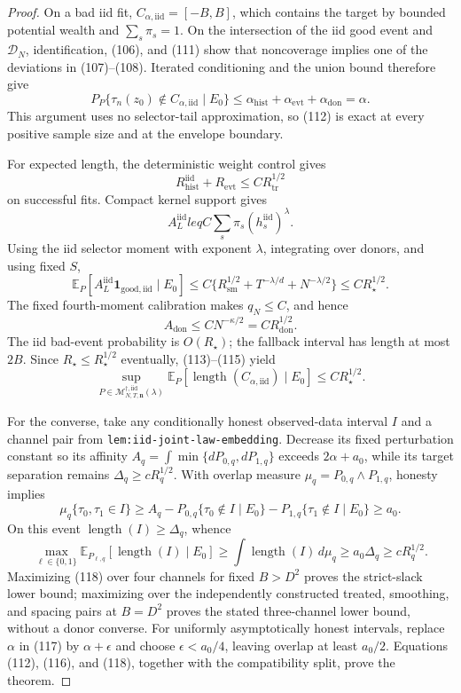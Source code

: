 \documentclass{article}
\begin{document}
\begin{proof}
On a bad iid fit, \(C_{\alpha,\mathrm{iid}}=[-B,B]\), which contains the target by bounded potential wealth and \(\sum_s\pi_s=1\).  On the intersection of the iid good event and \(\mathcal D_N\), identification, (106), and (111) show that noncoverage implies one of the deviations in (107)--(108).  Iterated conditioning and the union bound therefore give
\[
P_P\{\tau_n(z_0)\notin C_{\alpha,\mathrm{iid}}\mid E_0\}
\leq\alpha_{\mathrm{hist}}+\alpha_{\mathrm{evt}}+\alpha_{\mathrm{don}}
=\alpha.
\tag{112}
\]
This argument uses no selector-tail approximation, so (112) is exact at every positive sample size and at the envelope boundary.

For expected length, the deterministic weight control gives
\[
R_{\mathrm{hist}}^{\mathrm{iid}}+R_{\mathrm{evt}}
\leq CR_{\mathrm{tr}}^{1/2}
\tag{113}
\]
on successful fits.  Compact kernel support gives
\[
A_L^{\mathrm{iid}}leq C\sum_s\pi_s(h_s^{\mathrm{iid}})^\lambda.
\]
Using the iid selector moment with exponent \(\lambda\), integrating over donors, and using fixed \(S\),
\[
\mathbb E_P[A_L^{\mathrm{iid}}\mathbf1_{\mathrm{good,iid}}\mid E_0]
\leq C\{R_{\mathrm{sm}}^{1/2}+T^{-\lambda/d}+N^{-\lambda/2}\}
\leq CR_\star^{1/2}.
\tag{114}
\]
The fixed fourth-moment calibration makes \(q_N\leq C\), and hence
\[
A_{\mathrm{don}}\leq CN^{-\kappa/2}=CR_{\mathrm{don}}^{1/2}.
\tag{115}
\]
The iid bad-event probability is \(O(R_\star)\); the fallback interval has length at most \(2B\).  Since \(R_\star\leq R_\star^{1/2}\) eventually, (113)--(115) yield
\[
\sup_{P\in\mathcal M_{N,T,\mathbf n}^{\dagger,\mathrm{iid}}(\lambda)}
\mathbb E_P[\operatorname{length}(C_{\alpha,\mathrm{iid}})\mid E_0]
\leq CR_\star^{1/2}.
\tag{116}
\]

For the converse, take any conditionally honest observed-data interval \(I\) and a channel pair from \texttt{lem:iid-joint-law-embedding}.  Decrease its fixed perturbation constant so its affinity
\(A_q=\int\min\{dP_{0,q},dP_{1,q}\}\) exceeds \(2\alpha+a_0\), while its target separation remains \(\Delta_q\geq cR_q^{1/2}\).  With overlap measure \(\mu_q=P_{0,q}\wedge P_{1,q}\), honesty implies
\[
\mu_q\{\tau_0,\tau_1\in I\}
\geq A_q-P_{0,q}\{\tau_0\notin I\mid E_0\}
-P_{1,q}\{\tau_1\notin I\mid E_0\}
\geq a_0.
\tag{117}
\]
On this event \(\operatorname{length}(I)\geq\Delta_q\), whence
\[
\max_{\ell\in\{0,1\}}
\mathbb E_{P_{\ell,q}}[\operatorname{length}(I)\mid E_0]
\geq\int\operatorname{length}(I)\,d\mu_q
\geq a_0\Delta_q
\geq cR_q^{1/2}.
\tag{118}
\]
Maximizing (118) over four channels for fixed \(B>D^2\) proves the strict-slack lower bound; maximizing over the independently constructed treated, smoothing, and spacing pairs at \(B=D^2\) proves the stated three-channel lower bound, without a donor converse.  For uniformly asymptotically honest intervals, replace \(\alpha\) in (117) by \(\alpha+\epsilon\) and choose \(\epsilon<a_0/4\), leaving overlap at least \(a_0/2\).  Equations (112), (116), and (118), together with the compatibility split, prove the theorem.
\end{proof}
\end{document}

